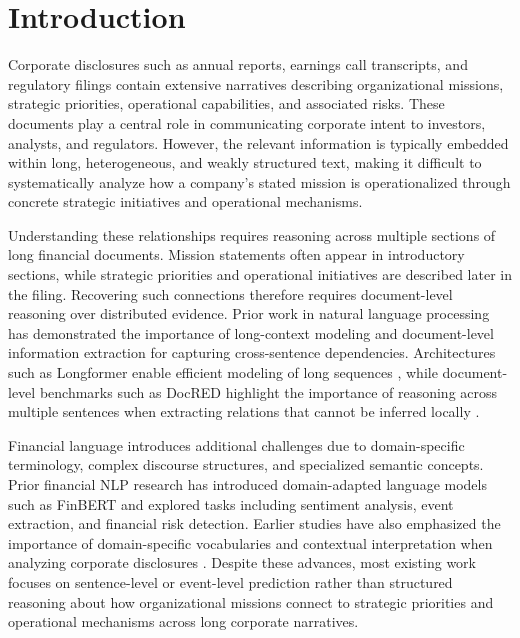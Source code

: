 \documentclass[11pt]{article}
\begin{document}
\section{Introduction}

Corporate disclosures such as annual reports, earnings call transcripts, and regulatory filings contain extensive narratives describing organizational missions, strategic priorities, operational capabilities, and associated risks. These documents play a central role in communicating corporate intent to investors, analysts, and regulators. However, the relevant information is typically embedded within long, heterogeneous, and weakly structured text, making it difficult to systematically analyze how a company’s stated mission is operationalized through concrete strategic initiatives and operational mechanisms.

Understanding these relationships requires reasoning across multiple sections of long financial documents. Mission statements often appear in introductory sections, while strategic priorities and operational initiatives are described later in the filing. Recovering such connections therefore requires document-level reasoning over distributed evidence. Prior work in natural language processing has demonstrated the importance of long-context modeling and document-level information extraction for capturing cross-sentence dependencies. Architectures such as Longformer enable efficient modeling of long sequences \cite{beltagy2020longformer}, while document-level benchmarks such as DocRED highlight the importance of reasoning across multiple sentences when extracting relations that cannot be inferred locally \cite{yao2019docred}.

Financial language introduces additional challenges due to domain-specific terminology, complex discourse structures, and specialized semantic concepts. Prior financial NLP research has introduced domain-adapted language models such as FinBERT \cite{araci2019finbert} and explored tasks including sentiment analysis, event extraction, and financial risk detection. Earlier studies have also emphasized the importance of domain-specific vocabularies and contextual interpretation when analyzing corporate disclosures \cite{loughran2011liability}. Despite these advances, most existing work focuses on sentence-level or event-level prediction rather than structured reasoning about how organizational missions connect to strategic priorities and operational mechanisms across long corporate narratives.
\end{document}
